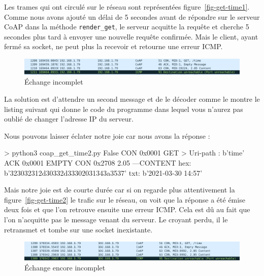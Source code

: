 Les trames qui ont circulé sur le réseau sont représentées figure~\vref{fig-get-time1}. Comme nous avons ajouté un délai de 5 secondes avant de répondre sur le serveur CoAP dans la méthode \texttt{render\_get}, le serveur acquitte la requête et cherche 5 secondes plus tard à envoyer une nouvelle requête confirmée. Mais le client, ayant fermé sa socket, ne peut plus la recevoir et retourne une erreur ICMP.

\begin{figure}[tbp]
\centerline{\includegraphics[width=1\columnwidth]{Pictures/get-time1.png}}
\caption{Échange incomplet}
\label{fig-get-time1}
\end{figure}

         \vspace{1em}


La solution est d'attendre un second message et de le décoder comme le montre le listing suivant qui donne le code du programme  dans lequel vous n'aurez pas oublié de changer l'adresse IP du serveur.


Nous pouvons laisser éclater notre joie car nous avons la réponse :

\begin{termc}[backgroundcolor=\color{gray!10}, basicstyle=\ttfamily\small, escapechar=@] 
> python3 coap_get_time2.py
False
CON  0x0001 GET   
> Uri-path : b'time'
ACK  0x0001 EMPTY 
CON  0x2708 2.05  
---CONTENT
hex: b'323032312d30332d33302031343a3537'
txt: b'2021-03-30 14:57'
\end{termc}

Mais notre joie est de courte durée car si on regarde plus attentivement la figure~\vref{fig-get-time2} le trafic sur le réseau, on voit que la réponse a été émise deux fois et que l'on retrouve ensuite une erreur ICMP. Cela est dû au fait que l'on n'acquitte pas le message venant du serveur. Le croyant perdu, il le retransmet et tombe sur une socket inexistante. 



\begin{figure}[tbp]
\centerline{\includegraphics[width=1\columnwidth]{Pictures/get-time2.png}}
\caption{Échange encore incomplet}
\label{fig-get-time2}
\end{figure}

